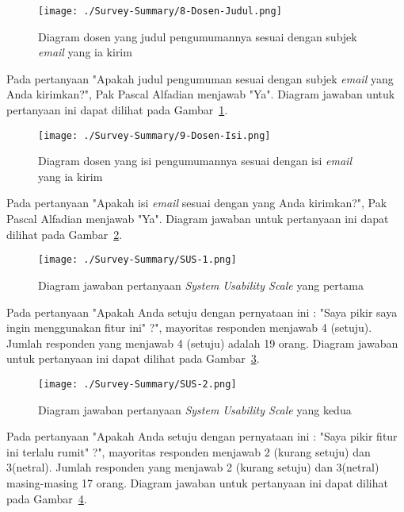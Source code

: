 \begin{figure}[H]
	\centering  
	\texttt{[image: ./Survey-Summary/8-Dosen-Judul.png]}
	\caption[Diagram dosen yang judul pengumumannya sesuai dengan subjek \textit{email} yang ia kirim]{Diagram dosen yang judul pengumumannya sesuai dengan subjek \textit{email} yang ia kirim} 
	\label{fig:summary-8-Dosen-Judul} 
\end{figure}

Pada pertanyaan "Apakah judul pengumuman sesuai dengan subjek \textit{email} yang Anda kirimkan?", Pak Pascal Alfadian menjawab "Ya". Diagram jawaban untuk pertanyaan ini dapat dilihat pada Gambar~\ref{fig:summary-8-Dosen-Judul}.

\begin{figure}[H]
	\centering  
	\texttt{[image: ./Survey-Summary/9-Dosen-Isi.png]}
	\caption[Diagram dosen yang isi pengumumannya sesuai dengan isi \textit{email} yang ia kirim]{Diagram dosen yang isi  pengumumannya sesuai dengan isi \textit{email} yang ia kirim} 
	\label{fig:summary-9-Dosen-Isi} 
\end{figure}

Pada pertanyaan "Apakah isi \textit{email} sesuai dengan yang Anda kirimkan?", Pak Pascal Alfadian menjawab "Ya". Diagram jawaban untuk pertanyaan ini dapat dilihat pada Gambar~\ref{fig:summary-9-Dosen-Isi}.

\begin{figure}[H]
	\centering  
	\texttt{[image: ./Survey-Summary/SUS-1.png]}
	\caption[Diagram jawaban pertanyaan \textit{System Usability Scale} yang pertama]{Diagram jawaban pertanyaan \textit{System Usability Scale} yang pertama} 
	\label{fig:summary-SUS-1} 
\end{figure}

Pada pertanyaan "Apakah Anda setuju dengan pernyataan ini : "Saya pikir saya ingin menggunakan fitur ini" ?", mayoritas responden menjawab 4 (setuju). Jumlah responden yang menjawab 4 (setuju) adalah 19 orang. Diagram jawaban untuk pertanyaan ini dapat dilihat pada Gambar~\ref{fig:summary-SUS-1}.

\begin{figure}[H]
	\centering  
	\texttt{[image: ./Survey-Summary/SUS-2.png]}
	\caption[Diagram jawaban pertanyaan \textit{System Usability Scale} yang kedua]{Diagram jawaban pertanyaan \textit{System Usability Scale} yang kedua} 
	\label{fig:summary-SUS-2} 
\end{figure}

Pada pertanyaan "Apakah Anda setuju dengan pernyataan ini : "Saya pikir fitur ini terlalu rumit" ?", mayoritas responden menjawab 2 (kurang setuju) dan 3(netral). Jumlah responden yang menjawab 2 (kurang setuju) dan 3(netral) masing-masing 17 orang. Diagram jawaban untuk pertanyaan ini dapat dilihat pada Gambar~\ref{fig:summary-SUS-2}.

